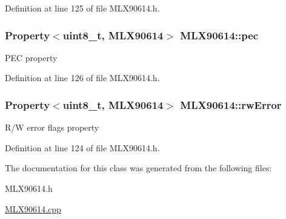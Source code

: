 Definition at line 125 of file M\-L\-X90614.\-h.

\hypertarget{class_m_l_x90614_af050e02eecd12a127a98fb2b30e40a88}{
\subsubsection[{pec}]{\setlength{\rightskip}{0pt plus 5cm}Property$<$uint8\-\_\-t, {\bf M\-L\-X90614}$>$ M\-L\-X90614\-::pec}}\label{class_m_l_x90614_af050e02eecd12a127a98fb2b30e40a88}
P\-E\-C property 

Definition at line 126 of file M\-L\-X90614.\-h.

\hypertarget{class_m_l_x90614_a13d10b57b4369c27e740585bf3907b0e}{
\subsubsection[{rw\-Error}]{\setlength{\rightskip}{0pt plus 5cm}Property$<$uint8\-\_\-t, {\bf M\-L\-X90614}$>$ M\-L\-X90614\-::rw\-Error}}\label{class_m_l_x90614_a13d10b57b4369c27e740585bf3907b0e}
R/\-W error flags property 

Definition at line 124 of file M\-L\-X90614.\-h.



The documentation for this class was generated from the following files\-:\begin{DoxyCompactItemize}
\item 
M\-L\-X90614.\-h\item 
\hyperlink{_m_l_x90614_8cpp}{M\-L\-X90614.\-cpp}\end{DoxyCompactItemize}
